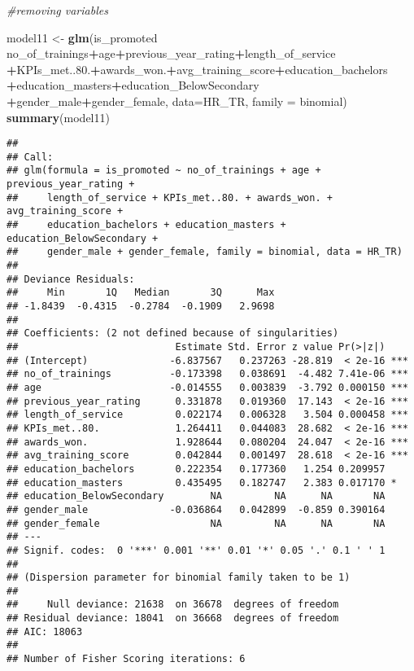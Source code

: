 \documentclass[
]{article}
\newenvironment{Shaded}{\begin{snugshade}}{\end{snugshade}}
\newcommand{\CommentTok}[1]{\textcolor[rgb]{0.56,0.35,0.01}{\textit{#1}}}
\newcommand{\DataTypeTok}[1]{\textcolor[rgb]{0.13,0.29,0.53}{#1}}
\newcommand{\FloatTok}[1]{\textcolor[rgb]{0.00,0.00,0.81}{#1}}
\newcommand{\KeywordTok}[1]{\textcolor[rgb]{0.13,0.29,0.53}{\textbf{#1}}}
\newcommand{\NormalTok}[1]{#1}
\newcommand{\OperatorTok}[1]{\textcolor[rgb]{0.81,0.36,0.00}{\textbf{#1}}}
\newcommand{\StringTok}[1]{\textcolor[rgb]{0.31,0.60,0.02}{#1}}
\begin{document}
\begin{Shaded}
\begin{Highlighting}[]
\CommentTok{#removing variables }

\NormalTok{model11 <-}\StringTok{ }\KeywordTok{glm}\NormalTok{(is_promoted }\OperatorTok{~}\StringTok{ }\NormalTok{no_of_trainings}\OperatorTok{+}\NormalTok{age}\OperatorTok{+}\NormalTok{previous_year_rating}\OperatorTok{+}\NormalTok{length_of_service}
               \OperatorTok{+}\NormalTok{KPIs_met..}\FloatTok{80.}\OperatorTok{+}\NormalTok{awards_won.}\OperatorTok{+}\NormalTok{avg_training_score}\OperatorTok{+}\NormalTok{education_bachelors}
               \OperatorTok{+}\NormalTok{education_masters}\OperatorTok{+}\NormalTok{education_BelowSecondary}
               \OperatorTok{+}\NormalTok{gender_male}\OperatorTok{+}\NormalTok{gender_female, }
               \DataTypeTok{data=}\NormalTok{HR_TR, }\DataTypeTok{family =}\NormalTok{ binomial)}
\KeywordTok{summary}\NormalTok{(model11)}
\end{Highlighting}
\end{Shaded}

\begin{verbatim}
## 
## Call:
## glm(formula = is_promoted ~ no_of_trainings + age + previous_year_rating + 
##     length_of_service + KPIs_met..80. + awards_won. + avg_training_score + 
##     education_bachelors + education_masters + education_BelowSecondary + 
##     gender_male + gender_female, family = binomial, data = HR_TR)
## 
## Deviance Residuals: 
##     Min       1Q   Median       3Q      Max  
## -1.8439  -0.4315  -0.2784  -0.1909   2.9698  
## 
## Coefficients: (2 not defined because of singularities)
##                           Estimate Std. Error z value Pr(>|z|)    
## (Intercept)              -6.837567   0.237263 -28.819  < 2e-16 ***
## no_of_trainings          -0.173398   0.038691  -4.482 7.41e-06 ***
## age                      -0.014555   0.003839  -3.792 0.000150 ***
## previous_year_rating      0.331878   0.019360  17.143  < 2e-16 ***
## length_of_service         0.022174   0.006328   3.504 0.000458 ***
## KPIs_met..80.             1.264411   0.044083  28.682  < 2e-16 ***
## awards_won.               1.928644   0.080204  24.047  < 2e-16 ***
## avg_training_score        0.042844   0.001497  28.618  < 2e-16 ***
## education_bachelors       0.222354   0.177360   1.254 0.209957    
## education_masters         0.435495   0.182747   2.383 0.017170 *  
## education_BelowSecondary        NA         NA      NA       NA    
## gender_male              -0.036864   0.042899  -0.859 0.390164    
## gender_female                   NA         NA      NA       NA    
## ---
## Signif. codes:  0 '***' 0.001 '**' 0.01 '*' 0.05 '.' 0.1 ' ' 1
## 
## (Dispersion parameter for binomial family taken to be 1)
## 
##     Null deviance: 21638  on 36678  degrees of freedom
## Residual deviance: 18041  on 36668  degrees of freedom
## AIC: 18063
## 
## Number of Fisher Scoring iterations: 6
\end{verbatim}
\end{document}
